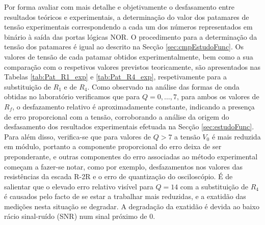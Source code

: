 \documentclass[a4paper, oneside]{article}
\begin{document}
Por forma avaliar com mais detalhe e objetivamente o desfasamento entre resultados teóricos e experimentais, a determinação do valor dos patamares de tensão experimentais correspondendo a cada um dos números representados em binário à saída das portas lógicas NOR. O procedimento para a determinação da tensão dos patamares é igual ao descrito na Secção \ref{sec:cmpEstudoFunc}.  Os valores de tensão de cada patamar obtidos experimentalmente, bem como a sua comparação com o respetivos valores previstos teoricamente, são apresentados nas Tabelas \ref{tab:Pat_R1_exp} e \ref{tab:Pat_R4_exp}, respetivamente para a substituição de $R_1$ e de $R_4$. Como observado na análise das formas de onda obtidas no laboratório verificamos que para $Q = 0,\ldots,7$, para ambos os valores de $R_f$, o desfazamento relativo é aproximadamente constante, indicando a presença de erro proporcional com a tensão, corroborando a análise da origem do desfasamento dos resultados experimentais efetuada na Secção \ref{sec:estudoFunc}. Para além disso, verifica-se que para valores de $Q>7$ a tensão $V_0$ é mais reduzida em módulo, portanto a componente proporcional do erro deixa de ser preponderante, e outras componentes do erro associadas ao método experimental começam a fazer-se notar, como por exemplo, desfazamentos nos valores das resistências da escada R-2R e o erro de quantização do osciloscópio. É de salientar que o elevado erro relativo visível para $Q=14$ com a substituição de $R_4$ é causados pelo facto de se estar a trabalhar mais reduzidas, e a exatidão das medições nesta situação se degradar. A degradação da exatidão é devida ao baixo rácio sinal-ruído (SNR) num sinal próximo de 0.  
\end{document}
